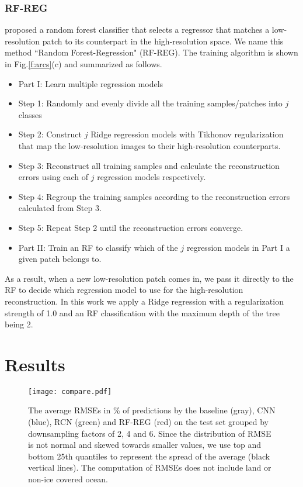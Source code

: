 \documentclass[]{copernicus}
\begin{document}
\subsubsection{RF-REG}
\cite{dou2018medical} proposed a random forest classifier that selects a regressor that matches a low-resolution patch to its counterpart in the high-resolution space. We name this method ``Random Forest-Regression" (RF-REG). 
The training algorithm is shown in Fig.\ref{f:arcs}(c) and summarized as follows. 
\begin{itemize}
\item Part I: Learn multiple regression models
    \item[] Step 1: Randomly and evenly divide all the training samples/patches into $j$ classes
    \item[] Step 2: Construct $j$ Ridge regression models with  Tikhonov regularization that map the low-resolution images to their high-resolution counterparts. 
    \item[] Step 3: Reconstruct all training samples and calculate the reconstruction errors using each of $j$ regression models respectively. 
    \item[] Step 4: Regroup the training samples according to the reconstruction errors calculated from Step 3.
    \item[] Step 5: Repeat Step 2 until the reconstruction errors converge.
\item Part II: Train an RF to classify which of the $j$ regression models in Part I a given patch belongs to. 
\end{itemize}
As a result, when a new low-resolution patch comes in, we pass it directly to the RF to decide which regression model to use for the high-resolution reconstruction. In this work we apply a Ridge regression with a regularization strength of 1.0 and an RF classification with the maximum depth of the tree being 2.

\section{Results}
\begin{figure*}
\centering
\noindent\texttt{[image: compare.pdf]}
\caption{The average RMSEs in \% of predictions by the baseline (gray), CNN (blue), RCN (green) and RF-REG (red) on the test set grouped by downsampling factors of 2, 4 and 6. Since the distribution of RMSE is not normal and skewed towards smaller values, we use top and bottom 25th quantiles to represent the spread of the average (black vertical lines). The computation of RMSEs does not include land or non-ice covered ocean.}
\label{f:compare}
\end{figure*}
\end{document}

